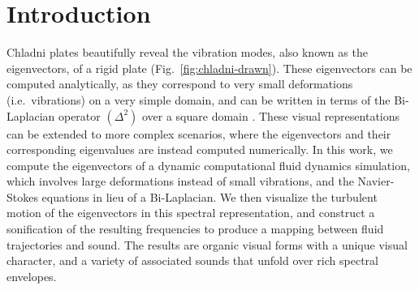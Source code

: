 \documentclass[11pt]{article}
\begin{document}
\section*{Introduction}
Chladni plates beautifully reveal the vibration modes, also known as the eigenvectors, of a rigid plate (Fig.~\ref{fig:chladni-drawn}). These eigenvectors can be computed analytically, as they correspond to very small deformations (i.e.~vibrations) on a very simple domain, and can be written in terms of the Bi-Laplacian operator $(\Delta^2)$ over a square domain \cite{gander2012euler}. These visual representations can be extended to more complex scenarios, where the eigenvectors and their corresponding eigenvalues are instead computed numerically. In this work, we compute the eigenvectors of a dynamic computational fluid dynamics simulation, which involves large deformations instead of small vibrations, and the Navier-Stokes equations in lieu of a Bi-Laplacian. We then visualize the turbulent motion of the eigenvectors in this spectral representation, and construct a sonification of the resulting frequencies to produce a mapping between fluid trajectories and sound. The results are organic visual forms with a unique visual character, and a variety of associated sounds that unfold over rich spectral envelopes.
\end{document}
